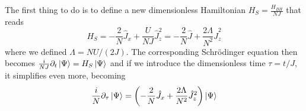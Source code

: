 The first thing to do is to define a new dimensionless Hamiltonian $ H_{S} = \frac{H_{BH}}{NJ} $ that reads
\begin{equation}
\label{eq:DimensionlessBoseHubbardHamiltonian}
	H_{S} = -\frac{2}{N}\hat{J}_x +\frac{U}{NJ}\hat{J}_z ^{2} = -\frac{2}{N} \hat{J}+ \frac{2\Lambda}{N^2}\hat{J}_z^2 
\end{equation}
where we defined $ \Lambda = NU/(2J) $. 
The corresponding Schr{\"o}dinger equation then becomes $ \frac{i}{NJ}\partial_t\ket{\Psi} = H_{S}\ket{\Psi} $ and if we introduce the dimensionless time $ \tau = t/J $, it simplifies even more, becoming
\begin{equation}
\label{eq:SchrodingerEquationDimensionless}
	\frac{i}{N}\partial_{\tau} \ket{\Psi} =
	\left( 
		-\frac{2}{N} \hat{J}_{x}+ \frac{2\Lambda}{N^2}\hat{J}_z^2 
	\right)\ket{\Psi}
\end{equation}

